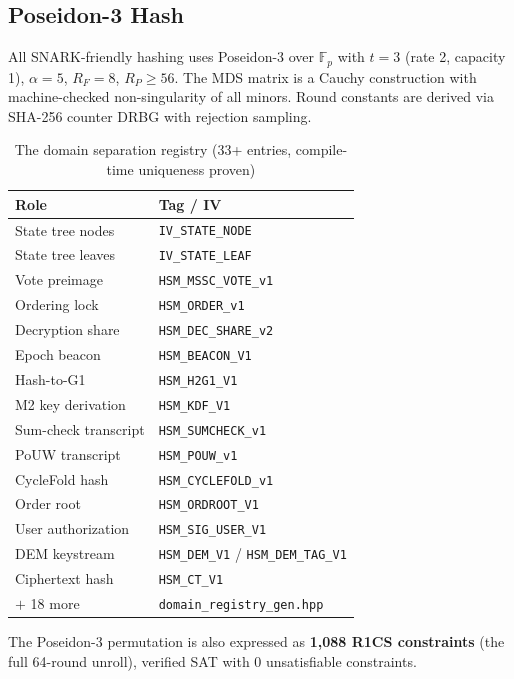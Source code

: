 \documentclass[11pt, a4paper]{article}
\theoremstyle{plain}
\theoremstyle{definition}
\theoremstyle{remark}
\newcommand{\fieldp}{\mathbb{F}_p}
\begin{document}
\subsection{Poseidon-3 Hash}

All SNARK-friendly hashing uses Poseidon-3 over $\fieldp$ with
 $t = 3$ (rate 2, capacity 1), $\alpha = 5$, $R_F = 8$, $R_P \ge 56$.
The MDS matrix is a Cauchy construction with machine-checked
non-singularity of all minors. Round constants are derived via SHA-256
counter DRBG with rejection sampling.

\begin{table}[h]
\centering
{}
\begin{tabular}{l|l}
\rowcolor{hsmaBlue!20} \textbf{Role} & \textbf{Tag / IV} \\
\hline
State tree nodes & \texttt{IV\_STATE\_NODE} \\
State tree leaves & \texttt{IV\_STATE\_LEAF} \\
Vote preimage & \texttt{HSM\_MSSC\_VOTE\_v1} \\
Ordering lock & \texttt{HSM\_ORDER\_v1} \\
Decryption share & \texttt{HSM\_DEC\_SHARE\_v2} \\
Epoch beacon & \texttt{HSM\_BEACON\_V1} \\
Hash-to-G1 & \texttt{HSM\_H2G1\_V1} \\
M2 key derivation & \texttt{HSM\_KDF\_V1} \\
Sum-check transcript & \texttt{HSM\_SUMCHECK\_v1} \\
PoUW transcript & \texttt{HSM\_POUW\_v1} \\
CycleFold hash & \texttt{HSM\_CYCLEFOLD\_v1} \\
Order root & \texttt{HSM\_ORDROOT\_V1} \\
User authorization & \texttt{HSM\_SIG\_USER\_V1} \\
DEM keystream & \texttt{HSM\_DEM\_V1} / \texttt{HSM\_DEM\_TAG\_V1} \\
Ciphertext hash & \texttt{HSM\_CT\_V1} \\
 $+$ 18 more & \texttt{domain\_registry\_gen.hpp} \\
\bottomrule
\end{tabular}
\caption{The domain separation registry (33+ entries, compile-time uniqueness proven)}
\end{table}

The Poseidon-3 permutation is also expressed as \textbf{1,088 R1CS
constraints} (the full 64-round unroll), verified SAT with 0
unsatisfiable constraints.
\end{document}

